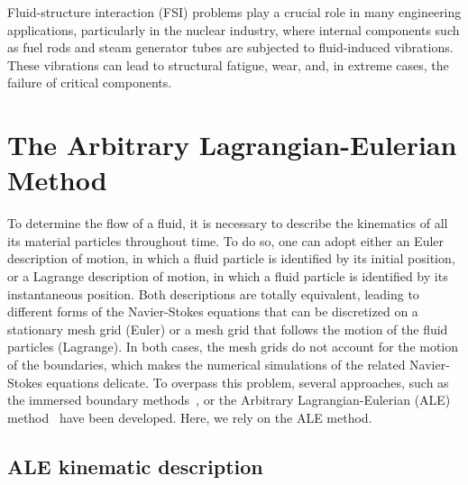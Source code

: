 
Fluid-structure interaction (FSI) problems play a crucial role in many engineering applications, particularly in the nuclear industry, where internal components such as fuel rods and steam generator tubes are subjected to fluid-induced vibrations. These vibrations can lead to structural fatigue, wear, and, in extreme cases, the failure of critical components.


\chapter{The Arbitrary Lagrangian-Eulerian Method}
To determine the flow of a fluid, it is necessary to describe the kinematics of all its material particles throughout time. To do so, one can adopt either an Euler description of motion, in which a fluid particle is identified by its initial position, or a Lagrange description of motion, in which a fluid particle is identified by its instantaneous position. 
Both descriptions are totally equivalent, leading to different forms of the Navier-Stokes equations that can be discretized on a stationary mesh grid (Euler) or a mesh grid that follows the motion of the fluid particles (Lagrange). In both cases, the mesh grids do not account for the motion of the boundaries, which makes the numerical simulations of the related Navier-Stokes equations delicate. To overpass this problem, several approaches, such as the immersed boundary methods~\cite{puscas2015three, puscas2015time, puscas2015conservative}, or the Arbitrary Lagrangian-Eulerian (ALE) method~\cite{donea2004arbitrary, fourestey2004second, koobus2000computation} have been developed. Here, we rely on the ALE method.

\section{ALE kinematic description}

